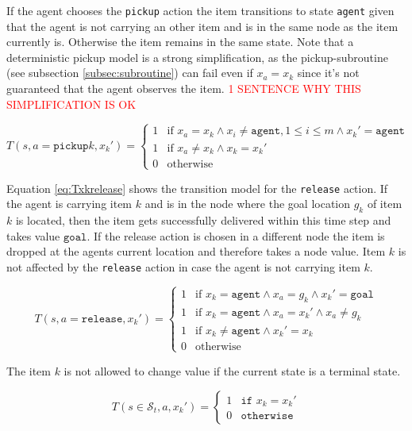 If the agent chooses the \texttt{pickup} action the item transitions to state \texttt{agent} given that the agent is not carrying an other item and is in the same node as the item currently is. Otherwise the item remains in the same state. Note that a deterministic pickup model is a strong simplification, as the pickup-subroutine (see subsection \ref{subsec:subroutine}) can fail even if $x_a=x_k$ since it's not guaranteed that the agent observes the item. \textcolor{red}{1 SENTENCE WHY THIS SIMPLIFICATION IS OK}

\begin{equation}\label{eq:Txkpickup}
T(s,a=\texttt{pickup}k, x_k') = \begin{cases}
             1 & \text{if }x_a=x_k \land x_i\neq \texttt{agent}, 1\leq i\leq m \land x_k'=\texttt{agent} \\
             1 & \text{if }x_a \neq x_k \land x_k=x_k' \\
             0 & \text{otherwise}
         \end{cases}
\end{equation}

Equation \ref{eq:Txkrelease} shows the transition model for the \texttt{release} action. If the agent is carrying item $k$ and is in the node where the goal location $g_k$ of item $k$ is located, then the item gets successfully delivered within this time step and takes value $\texttt{goal}$. If the release action is chosen in a different node the item is dropped at the agents current location and therefore takes a node value. Item $k$ is not affected by the \texttt{release} action in case the agent is not carrying item $k$.

\begin{equation}\label{eq:Txkrelease}
    T(s,a=\texttt{release}, x_k') = \begin{cases}
             1 & \text{if }x_k =\texttt{agent} \land x_a = g_k \land x_k' = \texttt{goal} \\
             1 & \text{if }x_k =\texttt{agent} \land x_a = x_k' \land x_a \neq g_k \\
             1 & \text{if }x_k\neq \texttt{agent} \land x_k'=x_k \\
             0 & \text{otherwise} 
             \end{cases}
\end{equation}

The item $k$ is not allowed to change value if the current state is a terminal state.

\begin{equation}\label{eq:Txkts}
    T(s\in\mathcal{S}_t, a, x_k') = \begin{cases}1 &\texttt{if }x_k=x_k'\\
         0& \texttt{otherwise}\end{cases}
\end{equation}


